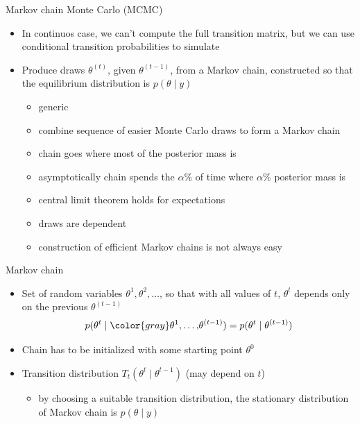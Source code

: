 \documentclass[finnish,english,t]{beamer}
\begin{document}
  
\begin{frame}{Markov chain Monte Carlo (MCMC)}

  \vspace{-\baselineskip}
  \begin{itemize}
  \item In continuos case, we can't compute the full transition
    matrix, but we can use conditional transition probabilities to
    simulate
  \item<2-> Produce draws $\theta^{(t)}$, given $\theta^{(t-1)}$, from a
    Markov chain, constructed so that the equilibrium
    distribution is $p(\theta \mid y)$
    \begin{itemize}
    \item<3->[+] generic
    \item<3->[+] combine sequence of easier Monte Carlo draws to form a Markov chain
    \item<4->[+] chain goes where most of the posterior mass is
    \item<4->[+] asymptotically chain spends the $\alpha$\% of time where
      $\alpha$\% posterior mass is
    \item<5->[+] central limit theorem holds for expectations 
    \item<6->[-] draws are dependent
    \item<6->[-] construction of efficient Markov chains is not always
      easy
    \end{itemize}
\end{itemize}

\end{frame}

\begin{frame}{Markov chain}

  \begin{itemize}
  \item Set of random variables $\theta^1,\theta^2,\ldots$, so that
    with all values of $t$, $\theta^t$ depends only on the previous $\theta^{(t-1)}$
    \begin{equation*}
      p(\theta^t \mid {\color{gray}\theta^1,\ldots,}\theta^{(t-1)})=p(\theta^t \mid \theta^{(t-1)})
    \end{equation*}
  \item<2-> Chain has to be initialized with some starting point $\theta^0$
  \item<3-> Transition distribution $T_t(\theta^t \mid \theta^{t-1})$ (may
    depend on $t$)
    \begin{itemize}
    \item by choosing a suitable transition distribution, the
      stationary distribution of Markov chain is $p(\theta \mid y)$
    \end{itemize}
  \end{itemize}

\end{frame}
\end{document}
